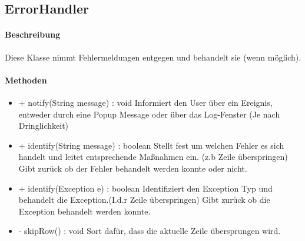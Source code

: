 \subsection{ErrorHandler}

\paragraph{Beschreibung}
Diese Klasse nimmt Fehlermeldungen entgegen und behandelt sie (wenn möglich).


\paragraph{Methoden}

\begin{itemize}
\item + notify(String message) : void
Informiert den User über ein Ereignis, entweder durch eine Popup Message oder über das Log-Fenster (Je nach Dringlichkeit)

\item + identify(String message) : boolean
Stellt fest um welchen Fehler es sich handelt und leitet entsprechende Maßnahmen ein. (z.b Zeile überspringen)
Gibt zurück ob der Fehler behandelt werden konnte oder nicht.

\item + identify(Exception e) : boolean
Identifiziert den Exception Typ und behandelt die Exception.(I.d.r Zeile überspringen)
Gibt zurück ob die Exception behandelt werden konnte.

\item - skipRow() : void
Sort dafür, dass die aktuelle Zeile übersprungen wird.
\end{itemize}
